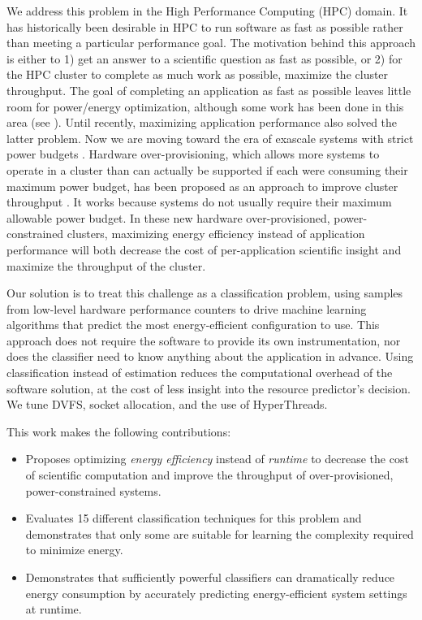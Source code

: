We address this problem in the High Performance Computing (HPC) domain.
It has historically been desirable in HPC to run software as fast as possible rather than meeting a particular performance goal.
The motivation behind this approach is either to 1) get an answer to a scientific question as fast as possible, or 2) for the HPC cluster to complete as much work as possible, \ie maximize the cluster throughput.
The goal of completing an application as fast as possible leaves little room for power/energy optimization, although some work has been done in this area (see ).
Until recently, maximizing application performance also solved the latter problem.
Now we are moving toward the era of exascale systems with strict power budgets \cite{Exascale20MW}.
Hardware over-provisioning, which allows more systems to operate in a cluster than can actually be supported if each were consuming their maximum power budget, has been proposed as an approach to improve cluster throughput \cite{PatkiRMAP}.
It works because systems do not usually require their maximum allowable power budget.
In these new hardware over-provisioned, power-constrained clusters, maximizing energy efficiency instead of application performance will both decrease the cost of per-application scientific insight and maximize the throughput of the cluster.

Our solution is to treat this challenge as a classification problem, using samples from low-level hardware performance counters to drive machine learning algorithms that predict the most energy-efficient configuration to use.
This approach does not require the software to provide its own instrumentation, nor does the classifier need to know anything about the application in advance.
Using classification instead of estimation reduces the computational overhead of the software solution, at the cost of less insight into the resource predictor's decision.
We tune DVFS, socket allocation, and the use of HyperThreads.

This work makes the following contributions:
\begin{itemize}
\item Proposes optimizing \emph{energy efficiency} instead of \emph{runtime} to decrease the cost of scientific computation and improve the throughput of over-provisioned, power-constrained systems.
\item Evaluates 15 different classification techniques for this problem and demonstrates that only some are suitable for learning the complexity required to minimize energy.
\item Demonstrates that sufficiently powerful classifiers can dramatically reduce energy consumption by accurately predicting energy-efficient system settings at runtime.
\end{itemize}
